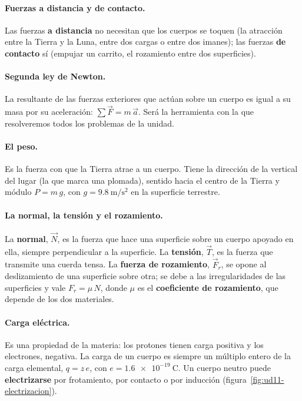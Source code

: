 \paragraph{Fuerzas a distancia y de contacto.} Las fuerzas \textbf{a distancia} no necesitan que los cuerpos se toquen (la atracción
entre la Tierra y la Luna, entre dos cargas o entre dos imanes); las fuerzas \textbf{de contacto} sí (empujar un carrito, el rozamiento
entre dos superficies).

\paragraph{Segunda ley de Newton.} La resultante de las fuerzas exteriores que actúan sobre un cuerpo es igual a su masa por su
aceleración: \(\sum \vec{F} = m\,\vec{a}\). Será la herramienta con la que resolveremos todos los problemas de la unidad.

\paragraph{El peso.} Es la fuerza con que la Tierra atrae a un cuerpo. Tiene la dirección de la vertical del lugar (la que marca una
plomada), sentido hacia el centro de la Tierra y módulo \(P = m\,g\), con \(g = \qty{9.8}{\m\per\s\squared}\) en la superficie terrestre.

\paragraph{La normal, la tensión y el rozamiento.} La \textbf{normal}, \(\vec{N}\), es la fuerza que hace una superficie sobre un cuerpo
apoyado en ella, siempre perpendicular a la superficie. La \textbf{tensión}, \(\vec{T}\), es la fuerza que transmite una cuerda tensa. La
\textbf{fuerza de rozamiento}, \(\vec{F}_r\), se opone al deslizamiento de una superficie sobre otra; se debe a las irregularidades de
las superficies y vale \(F_r = \mu\,N\), donde \(\mu\) es el \textbf{coeficiente de rozamiento}, que depende de los dos materiales.

\paragraph{Carga eléctrica.} Es una propiedad de la materia: los protones tienen carga positiva y los electrones, negativa. La carga
de un cuerpo es siempre un múltiplo entero de la carga elemental, \(q = z\,e\), con \(e = \qty{1.6e-19}{\coulomb}\). Un cuerpo neutro
puede \textbf{electrizarse} por frotamiento, por contacto o por inducción (figura~\ref{fig:ud11-electrizacion}).

